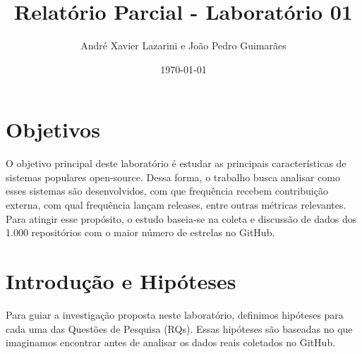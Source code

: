 \documentclass[12pt,a4paper]{article}
\title{Relatório Parcial - Laboratório 01}
\author{André Xavier Lazarini e João Pedro Guimarães}
\date{\today}
\begin{document}
\maketitle

\section{Objetivos}
O objetivo principal deste laboratório é estudar as principais características de sistemas populares open-source. Dessa forma, o trabalho busca analisar como esses sistemas são desenvolvidos, com que frequência recebem contribuição externa, com qual frequência lançam releases, entre outras métricas relevantes. Para atingir esse propósito, o estudo baseia-se na coleta e discussão de dados dos 1.000 repositórios com o maior número de estrelas no GitHub.

\section{Introdução e Hipóteses}
Para guiar a investigação proposta neste laboratório, definimos hipóteses para cada uma das Questões de Pesquisa (RQs). Essas hipóteses são baseadas no que imaginamos encontrar antes de analisar os dados reais coletados no GitHub.
\end{document}
